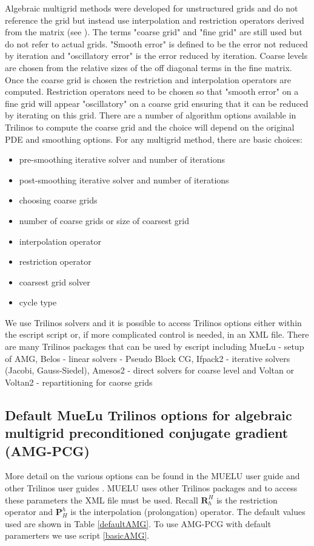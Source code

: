 Algebraic multigrid methods were developed for unstructured grids and do not reference the grid but instead use interpolation and restriction operators derived from the matrix (see \cite{Briggs2000, Stuben2001281, Vanek1996, Tuminaro2000}).  The terms "coarse grid" and "fine grid" are still used but do not refer to actual grids.  "Smooth error" is defined to be the error not reduced by iteration and "oscillatory error" is the error reduced by iteration.  Coarse levels are chosen from the relative sizes of the off diagonal terms in the fine matrix.
Once the coarse grid is chosen the restriction and interpolation operators are computed. Restriction operators need to be chosen so that "smooth error" on a fine grid will appear "oscillatory" on a coarse grid ensuring that it can be reduced by iterating on this grid. There are a number of algorithm options available in Trilinos to compute the coarse grid and the choice will depend on the original PDE and smoothing options. For any multigrid method, there are basic choices: 
\begin{itemize}%
    \item pre-smoothing iterative solver and number of iterations 
    \item post-smoothing iterative solver and number of iterations
    \item choosing coarse grids    
    \item number of coarse grids or size of coarsest grid
    \item interpolation operator
    \item restriction operator
    \item coarsest grid solver
    \item cycle type 
\end{itemize}
We use Trilinos solvers and it is possible to access Trilinos options either within the escript script or, if more complicated control is needed, in an XML file. There are many Trilinos packages that can be used by escript including 
MueLu   - setup of AMG, Belos   - linear solvers - Pseudo Block CG, Ifpack2 - iterative solvers (Jacobi, Gauss-Siedel), Amesos2 - direct solvers for coarse level and Voltan or Voltan2 - repartitioning for caorse grids


\subsection{Default MueLu Trilinos options for algebraic multigrid preconditioned conjugate gradient (AMG-PCG)}
More detail on the various options can be found in the MUELU user guide and other Trilinos user guides \cite{TrilinosWeb}. MUELU uses other Trilinos packages and to access these parameters the XML file must be used.  
Recall $\mathbf{R}_h^H$ is the restriction operator and $\mathbf{P}^h_H$ is the interpolation (prolongation) operator.  The default values used are shown in Table \ref{defaultAMG}.  To use AMG-PCG with default paramerters we use script \ref{basicAMG}. 

